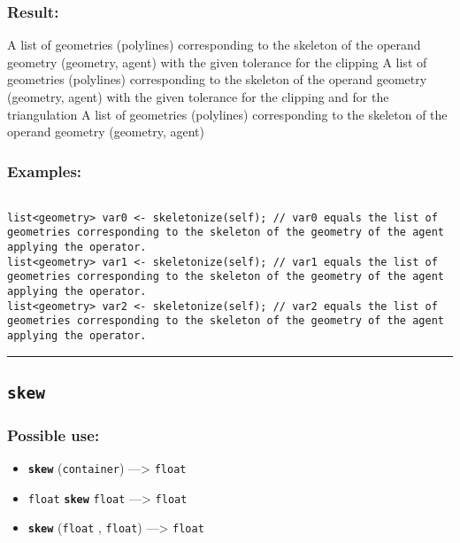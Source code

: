\documentclass[]{book}
\providecommand{\tightlist}{%
  \setlength{\itemsep}{0pt}\setlength{\parskip}{0pt}}
\theoremstyle{definition}
\theoremstyle{definition}
\theoremstyle{definition}
\theoremstyle{remark}
\begin{document}
\subsubsection{Result:}\label{result-463}

A list of geometries (polylines) corresponding to the skeleton of the
operand geometry (geometry, agent) with the given tolerance for the
clipping A list of geometries (polylines) corresponding to the skeleton
of the operand geometry (geometry, agent) with the given tolerance for
the clipping and for the triangulation A list of geometries (polylines)
corresponding to the skeleton of the operand geometry (geometry, agent)

\subsubsection{Examples:}\label{examples-335}

\begin{verbatim}
 
list<geometry> var0 <- skeletonize(self); // var0 equals the list of geometries corresponding to the skeleton of the geometry of the agent applying the operator. 
list<geometry> var1 <- skeletonize(self); // var1 equals the list of geometries corresponding to the skeleton of the geometry of the agent applying the operator. 
list<geometry> var2 <- skeletonize(self); // var2 equals the list of geometries corresponding to the skeleton of the geometry of the agent applying the operator.
\end{verbatim}

\begin{center}\rule{0.5\linewidth}{\linethickness}\end{center}

\subsection{\texorpdfstring{\texttt{skew}}{skew}}\label{skew}

\subsubsection{Possible use:}\label{possible-use-480}

\begin{itemize}
\tightlist
\item
  \textbf{\texttt{skew}} (\texttt{container}) ---\textgreater{}
  \texttt{float}
\item
  \texttt{float} \textbf{\texttt{skew}} \texttt{float} ---\textgreater{}
  \texttt{float}
\item
  \textbf{\texttt{skew}} (\texttt{float} , \texttt{float})
  ---\textgreater{} \texttt{float}
\end{itemize}
\end{document}
